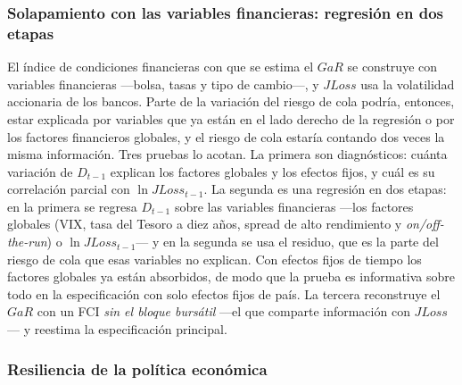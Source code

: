 \subsubsection{Solapamiento con las variables financieras: regresión en dos etapas}
\label{sec:est-solapamiento}

El índice de condiciones financieras con que se estima el $GaR$ se construye con variables financieras ---bolsa, tasas y tipo de cambio---, y $JLoss$ usa la volatilidad accionaria de los bancos. Parte de la variación del riesgo de cola podría, entonces, estar explicada por variables que ya están en el lado derecho de la regresión o por los factores financieros globales, y el riesgo de cola estaría contando dos veces la misma información. Tres pruebas lo acotan. La primera son diagnósticos: cuánta variación de $D_{t-1}$ explican los factores globales y los efectos fijos, y cuál es su correlación parcial con $\ln JLoss_{t-1}$. La segunda es una regresión en dos etapas: en la primera se regresa $D_{t-1}$ sobre las variables financieras ---los factores globales (VIX, tasa del Tesoro a diez años, spread de alto rendimiento y \textit{on/off-the-run}) o $\ln JLoss_{t-1}$--- y en la segunda se usa el residuo, que es la parte del riesgo de cola que esas variables no explican. Con efectos fijos de tiempo los factores globales ya están absorbidos, de modo que la prueba es informativa sobre todo en la especificación con solo efectos fijos de país. La tercera reconstruye el $GaR$ con un FCI \emph{sin el bloque bursátil} ---el que comparte información con $JLoss$--- y reestima la especificación principal.

\subsubsection{Resiliencia de la política económica}
\label{sec:est-resiliencia}

